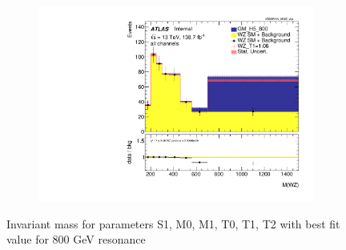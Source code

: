 \documentclass[../Bachelorarbeit.tex]{subfiles}
\begin{document}
\begin{figure}
\begin{subfigure}{0.3\textwidth}
    \end{subfigure}
    \begin{subfigure}{0.3\textwidth}
        \includegraphics[width=\textwidth]{Plots/ALL_MWZ_final/GM_H5_800/T1/2022-04-21/VBSSR/all_VV_MWZ_vbs.pdf}
    \end{subfigure}

    \caption{Invariant mass for parameters S1, M0, M1, T0, T1, T2 with best fit value for 800 GeV resonance}
    \label{fig:all_mwz_800}
\end{figure}
\end{document}
